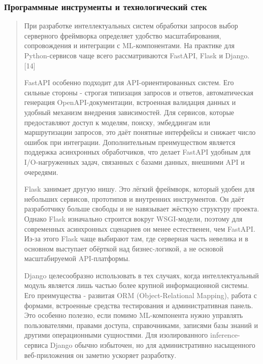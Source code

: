 \documentclass[
]{article}
\begin{document}
\hypertarget{ux43fux440ux43eux433ux440ux430ux43cux43cux43dux44bux435-ux438ux43dux441ux442ux440ux443ux43cux435ux43dux442ux44b-ux438-ux442ux435ux445ux43dux43eux43bux43eux433ux438ux447ux435ux441ux43aux438ux439-ux441ux442ux435ux43a}{%
\subsubsection{Программные инструменты и технологический
стек}\label{ux43fux440ux43eux433ux440ux430ux43cux43cux43dux44bux435-ux438ux43dux441ux442ux440ux443ux43cux435ux43dux442ux44b-ux438-ux442ux435ux445ux43dux43eux43bux43eux433ux438ux447ux435ux441ux43aux438ux439-ux441ux442ux435ux43a}}

\begin{quote}
При разработке интеллектуальных систем обработки запросов выбор
серверного фреймворка определяет удобство масштабирования, сопровождения
и интеграции с ML-компонентами. На практике для Python-сервисов чаще
всего рассматриваются FastAPI, Flask и Django.{[}14{]}

FastAPI особенно подходит для API-ориентированных систем. Его сильные
стороны - строгая типизация запросов и ответов, автоматическая генерация
OpenAPI-документации, встроенная валидация данных и удобный механизм
внедрения зависимостей. Для сервисов, которые предоставляют доступ к
моделям, поиску, эмбеддингам или маршрутизации запросов, это даёт
понятные интерфейсы и снижает число ошибок при интеграции.
Дополнительным преимуществом является поддержка асинхронных
обработчиков, что делает FastAPI удобным для I/O-нагруженных задач,
связанных с базами данных, внешними API и очередями.

Flask занимает другую нишу. Это лёгкий фреймворк, который удобен для
небольших сервисов, прототипов и внутренних инструментов. Он даёт
разработчику больше свободы и не навязывает жёсткую структуру проекта.
Однако Flask изначально строится вокруг WSGI-модели, поэтому для
современных асинхронных сценариев он менее естественен, чем FastAPI.
Из-за этого Flask чаще выбирают там, где серверная часть невелика и в
основном выступает обёрткой над бизнес-логикой, а не основой
масштабируемой API-платформы.

Django целесообразно использовать в тех случаях, когда интеллектуальный
модуль является лишь частью более крупной информационной системы. Его
преимущества - развитая ORM (Object-Relational Mapping), работа с
формами, встроенные средства тестирования и административная панель. Это
особенно полезно, если помимо ML-компонента нужно управлять
пользователями, правами доступа, справочниками, записями базы знаний и
другими операционными сущностями. Для изолированного inference-сервиса
Django обычно избыточен, но для административно насыщенного
веб-приложения он заметно ускоряет разработку.


\end{quote}
\end{document}
